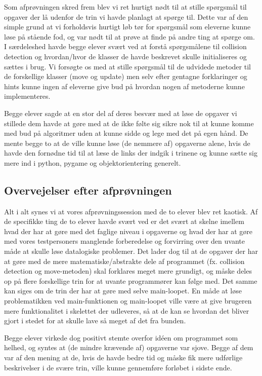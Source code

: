 \documentclass[10pt,a4paper,danish]{article}
\begin{document}
Som afprøvningen skred frem blev vi ret hurtigt nødt til at stille spørgsmål til 
opgaver der lå udenfor de trin vi havde planlagt at spørge til. Dette var af den 
simple grund at vi forholdsvis hurtigt løb tør for spørgsmål som eleverne kunne løse
på stående fod, og var nødt til at prøve at finde på andre ting at spørge om. I særdeleshed
havde begge elever svært ved at forstå spørgsmålene til collision detection og 
hvordan/hvor de klasser de havde beskrevet skulle initialiseres og sættes i brug. Vi 
forsøgte os med at stille spørgsmål til de udvidede metoder til de forskellige klasser
(move og update) men selv efter gentagne forklaringer og hints kunne
ingen af eleverne give bud på hvordan nogen af metoderne kunne implementeres. 

Begge elever sagde at en stor del af deres besvær med at løse de opgaver
vi stillede dem havde at gøre med at de ikke følte sig sikre nok til at kunne
komme med bud på algoritmer uden at kunne sidde og lege med det på egen hånd.
De mente begge to at de ville kunne løse (de nemmere af) opgaverne alene, hvis
de havde den fornødne tid til at læse de links der indgik i trinene og kunne
sætte sig mere ind i python, pygame og objektorientering generelt. 


\subsection{Overvejelser efter afprøvningen}
Alt i alt synes vi at vores afprøvningssession med de to elever blev ret kaotisk.
Af de specifikke ting de to elever havde svært ved er det svært at skelne imellem
hvad der har at gøre med det faglige niveau i opgaverne og hvad der har at gøre med
vores testpersoners manglende forberedelse og forvirring over den uvante måde at 
skulle løse datalogiske problemer. Det lader dog til at de opgaver der har at gøre
med de mere matematiske/abstrakte dele af programmet (fx. collision detection og move-metoden)
skal forklares meget mere grundigt, og måske deles op på flere forskellige trin for
at uvante programmører kan følge med. Det samme kan siges om de trin der har at gøre 
med selve main-loopet. En måde at løse problematikken ved main-funktionen og main-loopet
ville være at give brugeren mere funktionalitet i skelettet der udleveres, så at 
de kan se hvordan det bliver gjort i stedet for at skulle lave så meget af det
fra bunden. 

Begge elever virkede dog positivt stemte overfor idéen om programmet som helhed, 
og syntes at (de mindre krævende af) opgaverne var sjove. Begge af dem var af den 
mening at de, hvis de havde bedre tid og måske fik mere udførlige beskrivelser i de 
svære trin, ville kunne gennemføre forløbet i sidste ende. 
\end{document}
